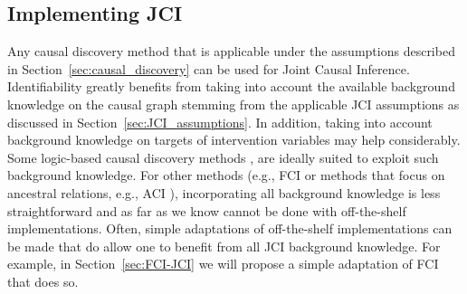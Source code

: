 \documentclass[twoside,11pt]{article}
\newcommand{\Joris}[1]{{\color{blue}#1}}
\begin{document}
\subsection{Implementing JCI}\label{sec:JCI_implementations}

Any causal discovery method that is applicable under the assumptions described in Section~\ref{sec:causal_discovery}
can be used for Joint Causal Inference. 
Identifiability greatly benefits from taking into account the available background knowledge on the
causal graph stemming from the applicable JCI assumptions as discussed in Section~\ref{sec:JCI_assumptions}. 
In addition, taking into account background
knowledge on targets of intervention variables may help considerably.
Some logic-based causal discovery methods \citep[e.g.,][]{HEJ2014,triantafillou2015constraint,ForreMooij_UAI_18}, are ideally suited to exploit such background knowledge.
For other methods (e.g., FCI \citep{SMR1999,Zhang2008_AI} or methods that focus on ancestral relations, e.g., ACI \citep{MagliacaneClaassenMooij_NIPS_16}), incorporating all background knowledge is less straightforward and as far as we know cannot be done with off-the-shelf implementations. Often, simple adaptations of off-the-shelf implementations can be made that do allow one to benefit from all JCI background knowledge. For example, in Section~\ref{sec:FCI-JCI} we will propose a simple adaptation of FCI that does so.

\end{document}

